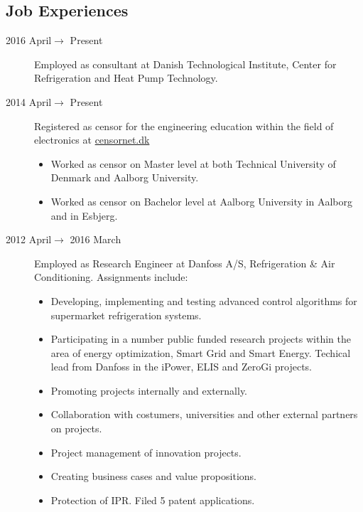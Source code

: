 \documentclass[margin,line,a4paper]{resume}
\begin{document}
\begin{resume}
    
\section{\mysidestyle Job Experiences}\vspace{1mm}
\begin{description}
\item[2016 April$\rightarrow$ Present] Employed as consultant at Danish Technological Institute, Center for Refrigeration and Heat Pump Technology.

   \item[2014 April$\rightarrow$ Present] Registered as censor for the engineering education within the field of electronics at \href{https://www.censornet.dk/welcome.htm}{censornet.dk}
     \begin{itemize}
     \item Worked as censor on Master level at both Technical University of Denmark and Aalborg University.
     \item Worked as censor on Bachelor level at Aalborg University in Aalborg and in Esbjerg.
     \end{itemize}
    
    \item[2012 April$\rightarrow$ 2016 March] Employed as Research Engineer at Danfoss A/S, Refrigeration \& Air Conditioning. Assignments include:
      \begin{itemize}
      \item Developing, implementing and testing advanced control algorithms for supermarket refrigeration systems.
      \item Participating in a number public funded research projects within the area of energy optimization, Smart Grid and Smart Energy. Techical lead from Danfoss in the iPower, ELIS and ZeroGi projects.
      \item Promoting projects internally and externally.
      \item Collaboration with costumers, universities and other external partners on projects. 
      \item Project management of innovation projects.
      \item Creating business cases and value propositions.
      \item Protection of IPR. Filed 5 patent applications.
      \end{itemize}


\end{description}
\end{resume}
\end{document}
